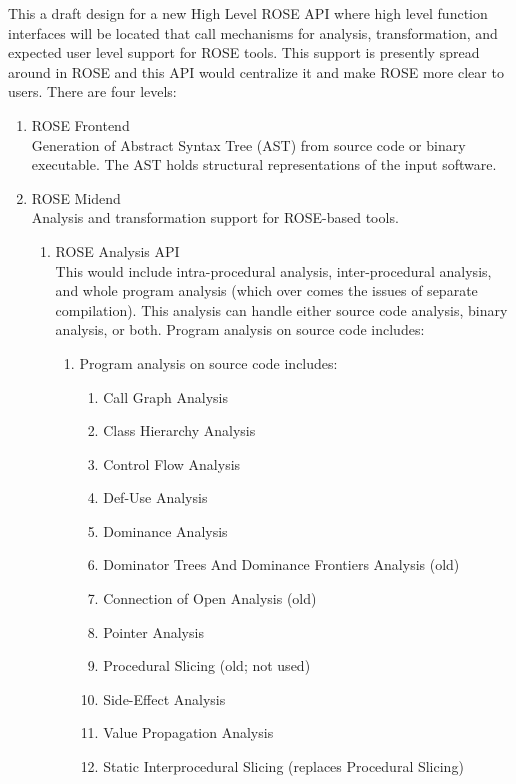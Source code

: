 This a draft design for a new High Level ROSE API where high level function interfaces will be
located that call mechanisms for analysis, transformation, and expected user level support
for ROSE tools. This support is presently spread around in ROSE and this API would
centralize it and make ROSE more clear to users.
There are four levels:
\begin{enumerate}
   \item ROSE Frontend \\
      Generation of Abstract Syntax Tree (AST) from source code or binary executable.
      The AST holds structural representations of the input software.

   \item ROSE Midend \\
      Analysis and transformation support for ROSE-based tools.
   \begin{enumerate}
      \item ROSE Analysis API \\
         This would include intra-procedural analysis, inter-procedural analysis, 
         and whole program analysis (which over comes the issues of separate compilation).
         This analysis can handle either source code analysis, binary analysis, or both.
         Program analysis on source code includes:
         \begin{enumerate}
            \item Program analysis on source code includes:
            \begin{enumerate}
               \item Call Graph Analysis
               \item Class Hierarchy Analysis
               \item Control Flow Analysis
               \item Def-Use Analysis
               \item Dominance Analysis
               \item Dominator Trees And Dominance Frontiers Analysis (old)
               \item Connection of Open Analysis (old)
               \item Pointer Analysis
               \item Procedural Slicing (old; not used) 
               \item Side-Effect Analysis
               \item Value Propagation Analysis
               \item Static Interprocedural Slicing (replaces Procedural Slicing)

\end{enumerate}
\end{enumerate}
\end{enumerate}
\end{enumerate}
